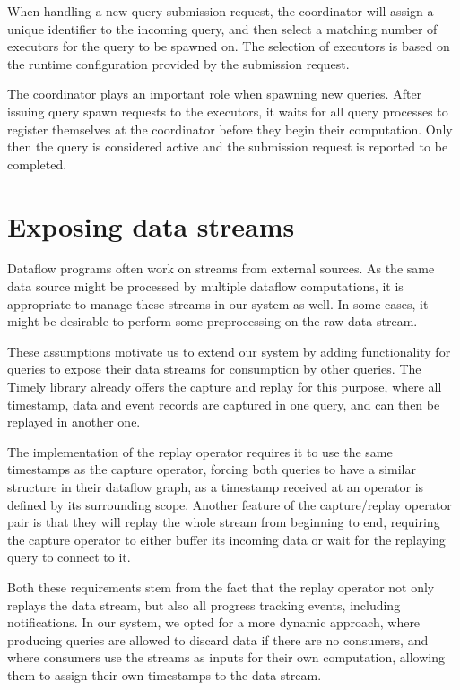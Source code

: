 When handling a new query submission request, the coordinator will assign a
unique identifier to the incoming query, and then select a
matching number of executors for the query to be spawned on. The selection
of executors is based on the runtime configuration provided by the submission
request.

The coordinator plays an important role when spawning new queries. After
issuing query spawn requests to the executors, it waits for all query processes
to register themselves at the coordinator before they begin their computation.
Only then the query is considered active and the submission request
is reported to be completed.



\section{Exposing data streams}

Dataflow programs often work on streams from external sources. As the same
data source might be processed by multiple dataflow computations, it is
appropriate to manage these streams in our system as well. In some cases, it
might be desirable to perform some preprocessing on the raw data stream.

These assumptions motivate us to extend our system by adding functionality
for queries to expose their data streams for consumption by other queries.
The Timely library already offers the capture and replay for this purpose, where
all timestamp, data and event records are captured in one query, and can then
be replayed in another one.

The implementation of the replay operator requires it to use the same timestamps
as the capture operator, forcing both queries to have a similar structure
in their dataflow graph, as a timestamp received at an operator is defined
by its surrounding scope. Another feature of the capture/replay operator pair
is that they will replay the whole stream from beginning to end, requiring the
capture operator to either buffer its incoming data or wait for the replaying
query to connect to it.

Both these requirements stem from the fact that the replay operator not only
replays the data stream, but also all progress tracking events, including
notifications. In our system, we opted for a more dynamic approach, where
producing queries are allowed to discard data if there are no consumers, and
where consumers use the streams as inputs for their own computation,
allowing them to assign their own timestamps to the data stream.

